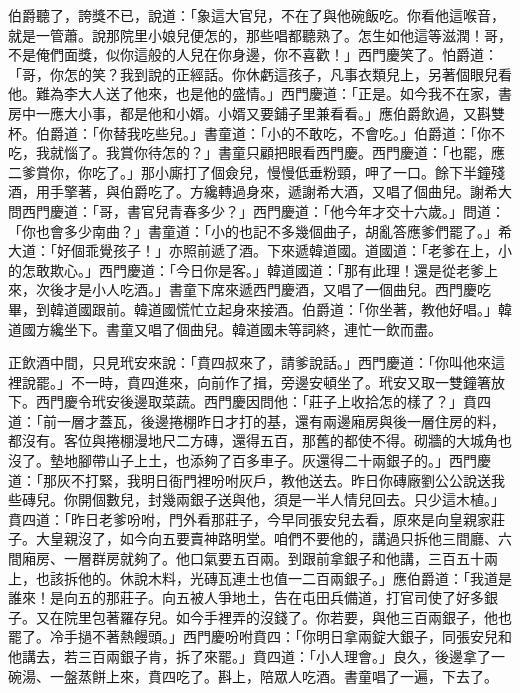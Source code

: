 伯爵聽了，誇獎不已，說道：「象這大官兒，不在了與他碗飯吃。你看他這喉音，就是一管蕭。說那院里小娘兒便怎的，那些唱都聽熟了。怎生如他這等滋潤！哥，不是俺們面獎，似你這般的人兒在你身邊，你不喜歡！」西門慶笑了。怕爵道：「哥，你怎的笑？我到說的正經話。你休虧這孩子，凡事衣類兒上，另著個眼兒看他。難為李大人送了他來，也是他的盛情。」西門慶道：「正是。如今我不在家，書房中一應大小事，都是他和小婿。小婿又要鋪子里兼看看。」應伯爵飲過，又斟雙杯。伯爵道：「你替我吃些兒。」書童道：「小的不敢吃，不會吃。」伯爵道：「你不吃，我就惱了。我賞你待怎的？」書童只顧把眼看西門慶。西門慶道：「也罷，應二爹賞你，你吃了。」那小廝打了個僉兒，慢慢低垂粉頸，呷了一口。餘下半鐘殘酒，用手擎著，與伯爵吃了。方纔轉過身來，遞謝希大酒，又唱了個曲兒。謝希大問西門慶道：「哥，書官兒青春多少？」西門慶道：「他今年才交十六歲。」問道：「你也會多少南曲？」書童道：「小的也記不多幾個曲子，胡亂答應爹們罷了。」希大道：「好個乖覺孩子！」亦照前遞了酒。下來遞韓道國。道國道：「老爹在上，小的怎敢欺心。」西門慶道：「今日你是客。」韓道國道：「那有此理！還是從老爹上來，次後才是小人吃酒。」書童下席來遞西門慶酒，又唱了一個曲兒。西門慶吃畢，到韓道國跟前。韓道國慌忙立起身來接酒。伯爵道：「你坐著，教他好唱。」韓道國方纔坐下。書童又唱了個曲兒。韓道國未等詞終，連忙一飲而盡。

正飲酒中間，只見玳安來說：「賁四叔來了，請爹說話。」西門慶道：「你叫他來這裡說罷。」不一時，賁四進來，向前作了揖，旁邊安頓坐了。玳安又取一雙鐘箸放下。西門慶令玳安後邊取菜蔬。西門慶因問他：「莊子上收拾怎的樣了？」賁四道：「前一層才蓋瓦，後邊捲棚昨日才打的基，還有兩邊廂房與後一層住房的料，都沒有。客位與捲棚漫地尺二方磚，還得五百，那舊的都使不得。砌牆的大城角也沒了。墊地腳帶山子上土，也添夠了百多車子。灰還得二十兩銀子的。」西門慶道：「那灰不打緊，我明日衙門裡吩咐灰戶，教他送去。昨日你磚廠劉公公說送我些磚兒。你開個數兒，封幾兩銀子送與他，須是一半人情兒回去。只少這木植。」 賁四道：「昨日老爹吩咐，門外看那莊子，今早同張安兒去看，原來是向皇親家莊子。大皇親沒了，如今向五要賣神路明堂。咱們不要他的，講過只拆他三間廳、六間廂房、一層群房就夠了。他口氣要五百兩。到跟前拿銀子和他講，三百五十兩上，也該拆他的。休說木料，光磚瓦連土也值一二百兩銀子。」應伯爵道：「我道是誰來！是向五的那莊子。向五被人爭地土，告在屯田兵備道，打官司使了好多銀子。又在院里包著羅存兒。如今手裡弄的沒錢了。你若要，與他三百兩銀子，他也罷了。冷手撾不著熱饅頭。」西門慶吩咐賁四：「你明日拿兩錠大銀子，同張安兒和他講去，若三百兩銀子肯，拆了來罷。」賁四道：「小人理會。」良久，後邊拿了一碗湯、一盤蒸餅上來，賁四吃了。斟上，陪眾人吃酒。書童唱了一遍，下去了。

